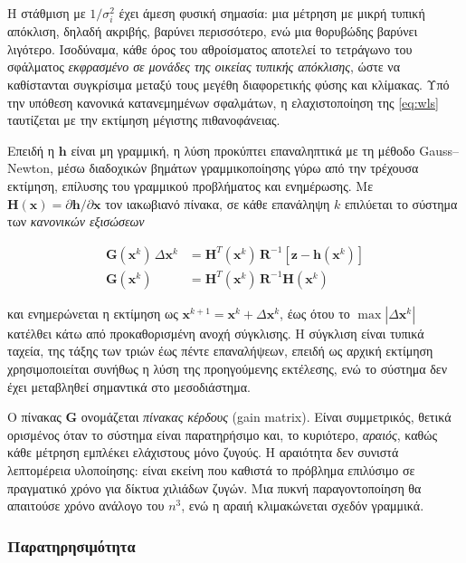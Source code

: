 Η στάθμιση με $1/\sigma_i^2$ έχει άμεση φυσική σημασία: μια μέτρηση με μικρή τυπική
απόκλιση, δηλαδή ακριβής, βαρύνει περισσότερο, ενώ μια θορυβώδης βαρύνει λιγότερο.
Ισοδύναμα, κάθε όρος του αθροίσματος αποτελεί το τετράγωνο του σφάλματος \emph{εκφρασμένο
σε μονάδες της οικείας τυπικής απόκλισης}, ώστε να καθίστανται συγκρίσιμα μεταξύ τους
μεγέθη διαφορετικής φύσης και κλίμακας. Υπό την υπόθεση κανονικά κατανεμημένων σφαλμάτων,
η ελαχιστοποίηση της \eqref{eq:wls} ταυτίζεται με την εκτίμηση μέγιστης πιθανοφάνειας.

Επειδή η $\mathbf{h}$ είναι μη γραμμική, η λύση προκύπτει επαναληπτικά με τη μέθοδο
Gauss--Newton, μέσω διαδοχικών βημάτων γραμμικοποίησης γύρω από την τρέχουσα εκτίμηση,
επίλυσης του γραμμικού προβλήματος και ενημέρωσης. Με
$\mathbf{H}(\mathbf{x}) = \partial \mathbf{h}/\partial \mathbf{x}$ τον ιακωβιανό πίνακα, σε
κάθε επανάληψη $k$ επιλύεται το σύστημα των \emph{κανονικών εξισώσεων}

\begin{align}
\mathbf{G}(\mathbf{x}^{k}) \, \Delta \mathbf{x}^{k}
  &= \mathbf{H}^{T}(\mathbf{x}^{k}) \, \mathbf{R}^{-1}
     \left[\mathbf{z} - \mathbf{h}(\mathbf{x}^{k})\right] \\
\mathbf{G}(\mathbf{x}^{k})
  &= \mathbf{H}^{T}(\mathbf{x}^{k}) \, \mathbf{R}^{-1} \mathbf{H}(\mathbf{x}^{k})
\label{eq:gain}
\end{align}

και ενημερώνεται η εκτίμηση ως $\mathbf{x}^{k+1} = \mathbf{x}^{k} + \Delta \mathbf{x}^{k}$,
έως ότου το $\max|\Delta \mathbf{x}^{k}|$ κατέλθει κάτω από προκαθορισμένη ανοχή
σύγκλισης. Η σύγκλιση είναι τυπικά ταχεία, της τάξης των τριών έως πέντε επαναλήψεων,
επειδή ως αρχική εκτίμηση χρησιμοποιείται συνήθως η λύση της προηγούμενης εκτέλεσης, ενώ το
σύστημα δεν έχει μεταβληθεί σημαντικά στο μεσοδιάστημα.

Ο πίνακας $\mathbf{G}$ ονομάζεται \emph{πίνακας κέρδους} (gain matrix). Είναι συμμετρικός,
θετικά ορισμένος όταν το σύστημα είναι παρατηρήσιμο και, το κυριότερο, \emph{αραιός}, καθώς κάθε μέτρηση εμπλέκει ελάχιστους
μόνο ζυγούς. Η αραιότητα δεν συνιστά λεπτομέρεια υλοποίησης: είναι εκείνη που καθιστά το
πρόβλημα επιλύσιμο σε πραγματικό χρόνο για δίκτυα χιλιάδων ζυγών. Μια πυκνή παραγοντοποίηση
θα απαιτούσε χρόνο ανάλογο του $n^3$, ενώ η αραιή κλιμακώνεται σχεδόν γραμμικά.

\subsubsection*{Παρατηρησιμότητα}

